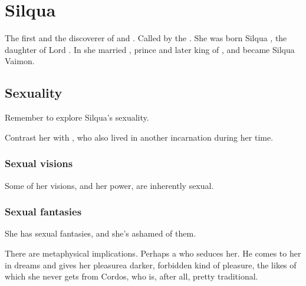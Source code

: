 \section{Silqua}
The first  and the discoverer of  and . 
Called  by the . 
She was born Silqua \Delaen, the daughter of Lord . 
In  she married , prince and later king of , and became Silqua Vaimon. 







\subsection{Sexuality}
Remember to explore Silqua's sexuality. 

Contrast her with \Belzir, who also lived in another incarnation during her time.





\subsubsection{Sexual visions}
Some of her visions, and her \malach{} power, are inherently sexual. 





\subsubsection{Sexual fantasies}
She has sexual fantasies, and she's ashamed of them. 

There are metaphysical implications. Perhaps a \resphan{} who seduces her. He comes to her in dreams and gives her pleasure\dash a darker, forbidden kind of pleasure, the likes of which she never gets from Cordos, who is, after all, pretty traditional. 

